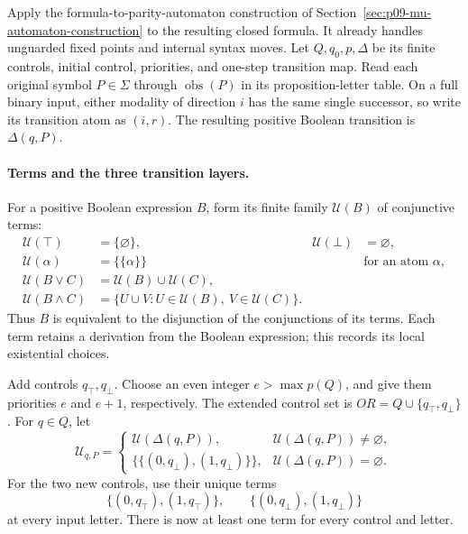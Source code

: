 Apply the formula-to-parity-automaton
construction of
Section~\ref{sec:p09-mu-automaton-construction}
to the resulting closed
formula. It already handles
unguarded fixed points and
internal syntax moves.
Let \(Q,q_0,p,\Delta\)
be its finite controls,
initial control, priorities,
and one-step transition map.
Read each original symbol
\(P\in\Sigma\) through
\(\operatorname{obs}(P)\) in
its proposition-letter table.
On a full binary input,
either modality of direction
\(i\) has the same single
successor, so write its
transition atom as \((i,r)\).
The resulting positive
Boolean transition is
\(\Delta(q,P)\).

\paragraph{Terms and the three transition layers.}
For a positive Boolean
expression \(B\), form its
finite family \(\mathcal U(B)\)
of conjunctive terms:
\[
\begin{aligned}
 \mathcal U(\top)&=\{\varnothing\},&
 \mathcal U(\bot)&=\varnothing,\\
 \mathcal U(\alpha)&=\{\{\alpha\}\}
       &&\text{for an atom }\alpha,\\
 \mathcal U(B\lor C)&=\mathcal U(B)\cup\mathcal U(C),\\
 \mathcal U(B\land C)&=
       \{U\cup V:U\in\mathcal U(B),\
                    V\in\mathcal U(C)\}.
\end{aligned}
\]
Thus \(B\) is equivalent
to the disjunction of
the conjunctions of its
terms. Each term retains
a derivation from the
Boolean expression; this
records its local existential
choices.

Add controls \(q_\top,q_\bot\).
Choose an even integer
\(e>\max p(Q)\), and
give them priorities \(e\)
and \(e+1\), respectively.
The extended control set
is \(OR=Q\cup\{q_\top,q_\bot\}\).
For \(q\in Q\), let
\[
 \mathcal U_{q,P}=
 \begin{cases}
  \mathcal U(\Delta(q,P)),
             &\mathcal U(\Delta(q,P))\ne\varnothing,\\
  \{\{(0,q_\bot),(1,q_\bot)\}\},
             &\mathcal U(\Delta(q,P))=\varnothing.
 \end{cases}
\]
For the two new controls,
use their unique terms
\[
 \{(0,q_\top),(1,q_\top)\},
 \qquad
 \{(0,q_\bot),(1,q_\bot)\}
\]
at every input letter.
There is now at least
one term for every
control and letter.

